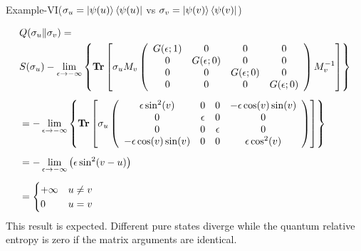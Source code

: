 \documentclass{beamer}
\begin{document}
\begin{frame}{Example-VI($\small \sigma_u=\ket{\psi(u)}\bra{\psi(u)}$ vs $\sigma_v=\ket{\psi(v)}\bra{\psi(v)}$)}
\begin{scriptsize}
\begin{align*}
&Q(\sigma_u \| \sigma_v) = \\
&S(\sigma_u)-\lim_{\epsilon \to -\infty} \left\{ \operatorname{\textup{\textbf{Tr}}} \left[
\sigma_u M_v
\left(
\begin{array}{cccc}
 G(\epsilon;1) & 0 & 0 & 0 \\
 0 &  G(\epsilon;0) & 0 & 0 \\
 0 & 0 &  G(\epsilon;0) & 0 \\
 0 & 0 & 0 &  G(\epsilon;0) \\
\end{array}
\right) M_v^{-1} \right] \right\} \nonumber \\[0.5em]
&= -\lim_{\epsilon \to -\infty} \left\{ \operatorname{\textup{\textbf{Tr}}} \left[ \sigma_u
\left(
\begin{array}{cccc}
 \epsilon  \sin ^2(v) & 0 & 0 & -\epsilon  \cos (v) \sin (v) \\
 0 & \epsilon  & 0 & 0 \\
 0 & 0 & \epsilon  & 0 \\
 -\epsilon  \cos (v) \sin (v) & 0 & 0 & \epsilon  \cos ^2(v) \\
\end{array}
\right)
 \right] \right\} \nonumber \\[0.5em]
&=-\lim_{\epsilon \to -\infty} \left( \epsilon  \sin ^2(v-u) \right) \nonumber \\[0.5em]
&=
\begin{cases}
   +\infty   &   u \neq v\\
   0  &   u=v
\end{cases}
\end{align*}
This result is expected. Different pure states diverge while the quantum relative entropy is zero if the matrix arguments are identical.
\end{scriptsize}
\end{frame}
\end{document}
